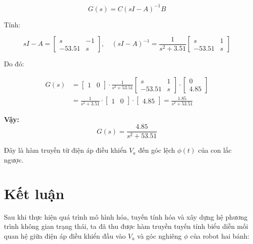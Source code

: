         \[
        G(s) = C(sI - A)^{-1}B
        \]
        
        Tính:
        
        \[
        sI - A =
        \begin{bmatrix}
            s & -1 \\
            -53.51 & s
        \end{bmatrix}, \quad
            (sI - A)^{-1} = \frac{1}{s^2 + 3.51}
        \begin{bmatrix}
            s & 1 \\
            -53.51 & s
        \end{bmatrix}
        \]
        
        Do đó:
        
        \begin{align*}
            G(s) &= \begin{bmatrix} 1 & 0 \end{bmatrix}
            \cdot \frac{1}{s^2 + 53.51}
        \begin{bmatrix}
            s & 1 \\
            -53.51 & s
        \end{bmatrix}
        \cdot
        \begin{bmatrix}
            0 \\
            4.85
        \end{bmatrix} \\
        &= \frac{1}{s^2 + 3.51} \cdot \begin{bmatrix} 1 & 0 \end{bmatrix}
        \cdot
        \begin{bmatrix}
            4.85
        \end{bmatrix}
        = \frac{1.85}{s^2 + 53.51}
        \end{align*}
        
        \textbf{Vậy:}
        \[
            G(s) = \frac{4.85}{s^2 + 53.51}
        \]
        
        Đây là hàm truyền từ điện áp điều khiển \( V_a \) đến góc lệch \( \phi(t) \) của con lắc ngược.
    \section{Kết luận}
        Sau khi thực hiện quá trình mô hình hóa, tuyến tính hóa và xây dựng hệ phương trình không gian trạng thái, ta đã thu được hàm truyền tuyến tính biểu diễn mối quan hệ giữa điện áp điều khiển đầu vào $V_a$ và góc nghiêng $\phi$ của robot hai bánh:

